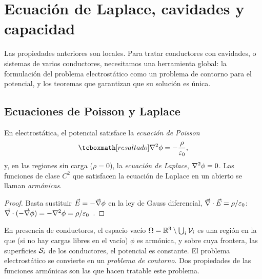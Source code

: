 \section{Ecuación de Laplace, cavidades y capacidad}\label{sec:cavidades}
Las propiedades anteriores son locales. Para tratar conductores con cavidades, o sistemas de varios conductores, necesitamos una herramienta
global: la formulación del problema electrostático como un problema de contorno para el potencial, y los teoremas que garantizan que su
solución es única.

\subsection{Ecuaciones de Poisson y Laplace}\label{sec:poisson}
\begin{proposicion}\label{prop:poisson}
En electrostática, el potencial satisface la \emph{ecuación de Poisson}
\begin{equation}\label{eq:poisson}
  \resalta{\Lap\phi=-\frac{\rho}{\eo},}
\end{equation}
y, en las regiones sin carga ($\rho=0$), la \emph{ecuación de Laplace}, $\nabla^{2}\phi=0$. Las funciones de clase $C^{2}$ que satisfacen la ecuación de
Laplace en un abierto se llaman \emph{armónicas}.
\end{proposicion}
\begin{proof}
Basta sustituir $\vec{E}=-\vec{\nabla}\phi$ en la ley de Gauss diferencial, $\vec{\nabla}\cdot\vec{E}=\rho/\varepsilon_{0}$:
$\vec{\nabla}\cdot(-\vec{\nabla}\phi)=-\nabla^{2}\phi=\rho/\varepsilon_{0}$~\cite{TEMA0,TEMA1}.
\end{proof}

En presencia de conductores, el espacio vacío $\Omega=\mathbb{R}^{3}\setminus\bigcup_i\mathcal{V}_i$ es una región en la que (si no hay cargas libres en el vacío)
$\phi$ es armónica, y sobre cuya frontera, las superficies $\mathcal{S}_i$ de los conductores, el potencial es constante. El problema electrostático se
convierte en un \emph{problema de contorno}. Dos propiedades de las funciones armónicas son las que hacen tratable este problema.


